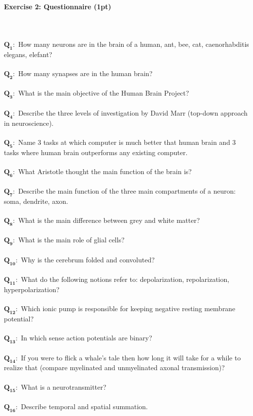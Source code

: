 \documentclass[a4paper,11pt]{article}
\newenvironment{exercise}[3]{\paragraph{Exercise #1: #2 (#3pt)}\ \\}{
\medskip}
\newcommand{\question}[2]{\setlength\parindent{0mm}\ \\$\mathbf{Q_{#1}:}$ #2\ \\}
\begin{document}
\begin{exercise}{2}{Questionnaire}{1}
\question{1}{How many neurons are in the brain of a human, ant, bee, cat, caenorhabditis elegans, elefant?}
\question{2}{How many synapses are in the human brain?}
\question{3}{What is the main objective of the Human Brain Project?}
\question{4}{Describe the three levels of investigation by David Marr (top-down approach in neuroscience).}
\question{5}{Name 3 tasks at which computer is much better that human brain and 3 tasks where human brain outperforms any existing computer.}
\question{6}{What Aristotle thought the main function of the brain is?}
\question{7}{Describe the main function of the three main compartments of a neuron: soma, dendrite, axon.}
\question{8}{What is the main difference between grey and white matter?}
\question{9}{What is the main role of glial cells?}
\question{10}{Why is the cerebrum folded and convoluted?}
\question{11}{What do the following notions refer to: depolarization, repolarization, hyperpolarization?}
\question{12}{Which ionic pump is responsible for keeping negative resting membrane potential?}
\question{13}{In which sense action potentials are binary?}
\question{14}{If you were to flick a whale's tale then how long it will take for a while to realize that (compare myelinated and unmyelinated axonal transmission)?}
\question{15}{What is a neurotransmitter?}
\question{16}{Describe temporal and spatial summation.}
\end{exercise}
\end{document}
